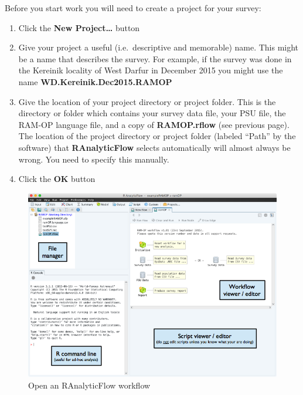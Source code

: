 \documentclass[12pt,]{book}
\theoremstyle{definition}
\theoremstyle{definition}
\theoremstyle{definition}
\theoremstyle{remark}
\begin{document}
Before you start work you will need to create a project for your survey:

\begin{enumerate}
\def\labelenumi{\arabic{enumi}.}
\item
  Click the \textbf{New Project\ldots{}} button
\item
  Give your project a useful (i.e.~descriptive and memorable) name. This
  might be a name that describes the survey. For example, if the survey
  was done in the Kereinik locality of West Darfur in December 2015 you
  might use the name \textbf{WD.Kereinik.Dec2015.RAMOP}
\item
  Give the location of your project directory or project folder. This is
  the directory or folder which contains your survey data file, your PSU
  file, the RAM-OP language file, and a copy of \textbf{RAMOP.rflow}
  (see previous page). The location of the project directory or project
  folder (labeled ``Path'' by the software) that \textbf{RAnalyticFlow}
  selects automatically will almost always be wrong. You need to specify
  this manually.
\item
  Click the \textbf{OK} button
\end{enumerate}

\begin{figure}[h]

{\centering \includegraphics[width=10.12in]{figures/openWorkflowRAF} 

}

\caption{Open an RAnalyticFlow workflow}\label{fig:raf3}
\end{figure}
\end{document}
